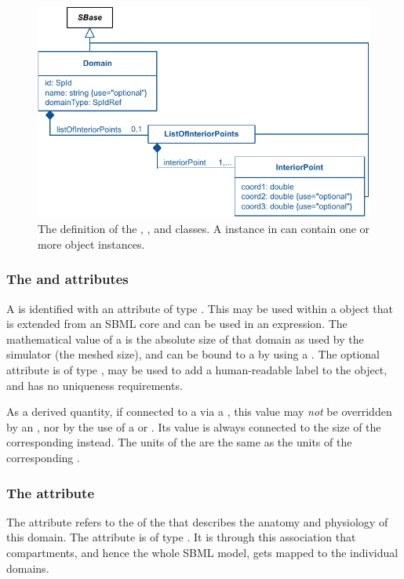 \begin{figure}[ht]
  \includegraphics{figs/Domain-uml}
  \caption{The definition of the \Domain, \ListOfInteriorPoints, and \InteriorPoint classes.  A \ListOfDomains instance in \Geometry can contain one or more \Domain object instances.}
  \label{Domain-uml}
  \label{InteriorPoint-uml}
  \label{ListOfInteriorPoints-uml}
\end{figure}

\subsubsection{The \fixttspace{} and \fixttspace{} attributes}
A \Domain is identified with an  attribute of type .  This  may be used within a \SpatialSymbolReference object that is extended from an SBML core \Parameter and can be used in an expression.  The mathematical value of a \Domain is the absolute size of that domain as used by the simulator (the meshed size), and can be bound to a \Parameter by using a \SpatialSymbolReference {}.  The optional  attribute is of type , may be used to add a human-readable label to the object, and has no uniqueness requirements.

As a derived quantity, if connected to a \Parameter via a \SpatialSymbolReference, this value may \emph{not} be overridden by an \InitialAssignment, nor by the use of a \Rule or \Event.  Its value is always connected to the size of the corresponding \Geometry instead.  The units of the \Domain are the same as the units of the corresponding \DomainType.

\subsubsection{The \fixttspace{} attribute}
The  attribute refers to the  of the \DomainType that describes the anatomy and physiology of this domain. The attribute is of type . It is through this association that compartments, and hence the whole SBML model, gets mapped to the individual domains. 


